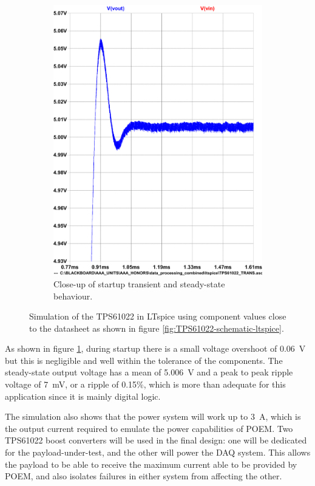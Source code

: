 \documentclass[draft]{report}
\begin{document}
\begin{figure}[H]
\begin{subfigure}{0.495\textwidth}
    \includegraphics[width=\linewidth]{images/TPS61022-simulation-plot-overshoot.pdf}
    \caption{Close-up of startup transient and steady-state behaviour.}
  \end{subfigure}
  \caption{Simulation of the TPS61022 in LTspice using component values close to the datasheet as shown in figure \ref{fig:TPS61022-schematic-ltspice}.}
  \label{fig:TPS61022-simulation-ltspice}
\end{figure}

As shown in figure \ref{fig:TPS61022-simulation-ltspice}, during startup there is a small voltage overshoot of \SI{0.06}{\volt} but this is negligible and well within the tolerance of the components. The steady-state output voltage has a mean of \SI{5.006}{\volt} and a peak to peak ripple voltage of \SI{7}{\milli\volt}, or a ripple of 0.15\%, which is more than adequate for this application since it is mainly digital logic.

The simulation also shows that the power system will work up to \SI{3}{\ampere}, which is the output current required to emulate the power capabilities of POEM. Two TPS61022 boost converters will be used in the final design: one will be dedicated for the payload-under-test, and the other will power the DAQ system. This allows the payload to be able to receive the maximum current able to be provided by POEM, and also isolates failures in either system from affecting the other.
\end{document}
